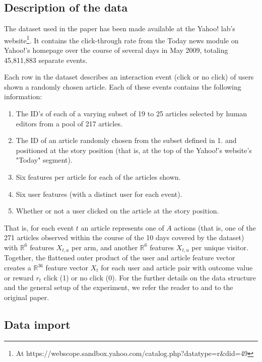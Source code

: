 \documentclass{jss}
\begin{document}
\subsection{Description of the data} \label{datadesc}

The dataset used in the \cite{Li2010} paper has been made available at the Yahoo! lab's website\footnote{At https://webscope.sandbox.yahoo.com/catalog.php?datatype=r\&did=49}. It contains the click-through rate from the Today news module on Yahoo!'s homepage over the course of several days in May 2009, totaling 45,811,883 separate events.

Each row in the dataset describes an interaction event (click or no click) of users shown a randomly chosen article. Each of these events contains the following information:

\begin{enumerate}
         \item The ID's of each of a varying subset of 19 to 25 articles selected by human editors from a pool of 217 articles.
         \item The ID of an article randomly chosen from the subset defined in 1. and positioned at the story position (that is, at the top of the Yahoo!'s website's "Today" segment).
         \item Six features per article for each of the articles shown.
         \item Six user features (with a distinct user for each event).
         \item Whether or not a user clicked on the article at the story position.
\end{enumerate}

That is, for each event $t$ an article represents one of $A$ actions (that is, one of the 271 articles observed within the course of the 10 days covered by the dataset) with $\mathbb{R}^6$ features $X_{t,a}$ per arm, and another $\mathbb{R}^6$ features $X_{t,u}$ per unique visitor. Together, the flattened outer product of the user and article feature vector creates a $\mathbb{R}^{36}$ feature vector $X_t$ for each user and article pair with outcome value or reward $r_t$ click (1) or no click (0). For the further details on the data structure and the general setup of the experiment, we refer the reader to \cite{Chu2009} and to the original \cite{Li2010} paper.

\subsection{Data import} \label{dataimp}
\end{document}
